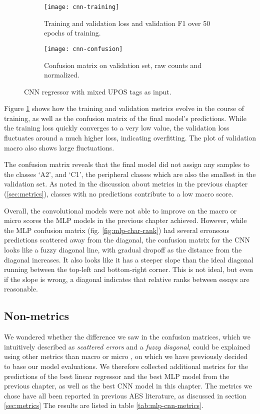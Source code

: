 \begin{figure}
  \begin{subfigure}{\linewidth}
    \centering
    \texttt{[image: cnn-training]}
    \caption{
      Training and validation loss and validation F1 over 50 epochs of
      training.
    }
  \end{subfigure}
  \begin{subfigure}{\linewidth}
    \centering
    \texttt{[image: cnn-confusion]}
    \caption{
      Confusion matrix on validation set, raw counts and normalized.
    }
  \end{subfigure}
  \caption[Training behaviour of CNN regression]{
    CNN regressor with mixed UPOS tags as input.
  }
  \label{fig:cnn-training}
\end{figure}

Figure \ref{fig:cnn-training} shows how the training and validation metrics
evolve in the course of training, as well as the confusion matrix of the
final model's predictions. While the training loss quickly converges to a
very low value, the validation loss fluctuates around a much higher loss,
indicating overfitting. The plot of validation macro \FI also shows large
fluctuations.

The confusion matrix reveals that the final model did not assign any samples
to the classes `A2', and `C1', the peripheral classes which are also the
smallest in the validation set. As noted in the discussion about metrics in
the previous chapter (\ref{sec:metrics}), classes with no predictions
contribute to a low macro \FI score.

Overall, the convolutional models were not able to improve on the macro or
micro \FI scores the \ac{MLP} models in the previous chapter achieved.
However, while the \ac{MLP} confusion matrix (fig. \ref{fig:mlp-char-rank})
had several erroneous predictions scattered away from the diagonal, the
confusion matrix for the \ac{CNN} looks like a fuzzy diagonal line, with
gradual dropoff as the distance from the diagonal increases. It also looks
like it has a steeper slope than the ideal diagonal running between the
top-left and bottom-right corner. This is not ideal, but even if the slope
is wrong, a diagonal indicates that relative ranks between essays are
reasonable.


\subsection{Non-\FI metrics}

We wondered whether the difference we saw in the confusion matrices, which we
intuitively described as \emph{scattered errors} and a \emph{fuzzy diagonal},
could be explained using other metrics than macro or micro \FI, on which we
have previously decided to base our model evaluations. We therefore collected
additional metrics for the predictions of the best linear regressor and the
best MLP model from the previous chapter, as well as the best CNN model in
this chapter. The metrics we chose have all been reported in previous
\ac{AES} literature, as discussed in section \ref{sec:metrics} The results
are listed in table \ref{tab:mlp-cnn-metrics}.

